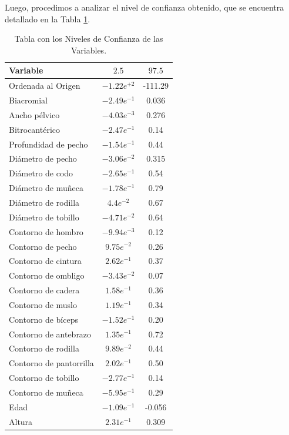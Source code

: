 \documentclass{article} %
\begin{document}
Luego, procedimos a analizar el nivel de confianza obtenido, que se encuentra detallado en la Tabla \ref{tab:table-punto-1-3-b}.

\begin{table}[H]
	\centering
		\begin{tabular}{||l | c | c ||}
			\hline
			\hline
			Variable & $2.5$ & $97.5$\\
			\hline			
			\hline
			Ordenada al Origen & $-1.22e^{+2}$ & -111.29 \\
			\hline
			Biacromial & $-2.49e^{-1}$ & 0.036\\
			\hline
			Ancho pélvico &  $-4.03e^{-3}$ & 0.276\\
			\hline
			Bitrocantérico & $-2.47e^{-1}$ & 0.14\\
			\hline
			Profundidad de pecho & $-1.54e^{-1}$ & 0.44\\
			\hline
			Diámetro de pecho &  $-3.06e^{-2}$ & 0.315\\
			\hline
			Diámetro de codo & $-2.65e^{-1}$ & 0.54\\
			\hline
			Diámetro de muñeca & $-1.78e^{-1}$ & 0.79\\
			\hline
			Diámetro de rodilla &  $4.4e^{-2}$ & 0.67\\
			\hline
			Diámetro de tobillo & $-4.71e^{-2}$ & 0.64\\
			\hline
			Contorno de hombro & $-9.94e^{-3}$ & 0.12\\
			\hline
			Contorno de pecho &  $9.75e^{-2}$ & 0.26\\
			\hline
			Contorno de cintura & $2.62e^{-1}$ & 0.37\\
			\hline
			Contorno de ombligo & $-3.43e^{-2}$ & 0.07\\
			\hline
			Contorno de cadera &  $1.58e^{-1}$ & 0.36\\
			\hline
			Contorno de muslo & $1.19e^{-1}$ & 0.34\\
			\hline
			Contorno de bíceps & $-1.52e^{-1}$ & 0.20\\
			\hline
			Contorno de antebrazo &  $1.35e^{-1}$ & 0.72\\
			\hline
			Contorno de rodilla & $9.89e^{-2}$ & 0.44\\
			\hline
			Contorno de pantorrilla & $2.02e^{-1}$ & 0.50\\
			\hline
			Contorno de tobillo &  $-2.77e^{-1}$ & 0.14\\
			\hline
			Contorno de muñeca & $-5.95e^{-1}$ & 0.29\\
			\hline
			Edad & $-1.09e^{-1}$ & -0.056\\
			\hline
			Altura & $2.31e^{-1}$ & 0.309\\
			\hline
			\hline
		\end{tabular}
		\caption{Tabla con los Niveles de Confianza de las Variables.}
	\label{tab:table-punto-1-3-b}
\end{table}
\end{document}
